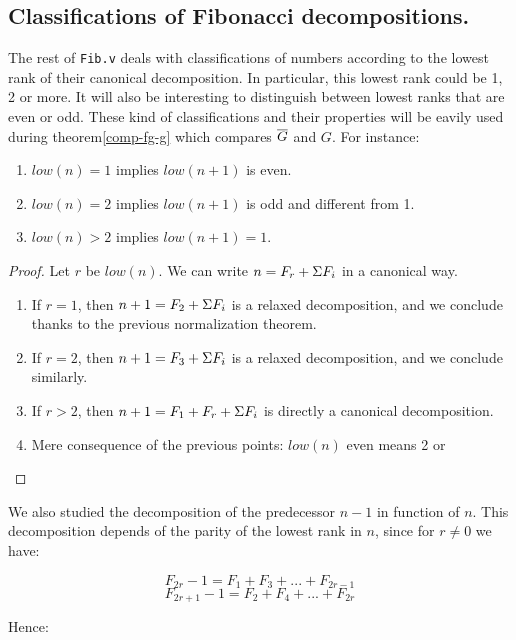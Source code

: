 \documentclass[a4paper,11pt]{article}
\begin{document}
\subsection{Classifications of Fibonacci decompositions.}
The rest of {\tt Fib.v} deals with classifications of numbers
according to the lowest rank of their canonical decomposition.
In particular, this lowest rank could be 1, 2 or more. It will
also be interesting to distinguish between lowest ranks that
are even or odd. These kind of classifications and their
properties will be eavily used
during theorem\ref{comp-fg-g} which compares $\overline{G}$ and $G$.
For instance:
\begin{theorem}\label{fibsucc}
\noindent
\begin{enumerate}
\item $low(n) = 1$ implies $low(n+1)$ is even.
\item $low(n) = 2$ implies $low(n+1)$ is odd and different from 1.
\item $low(n) > 2$ implies $low(n+1) = 1$.
\end{enumerate}
\end{theorem}
\begin{proof}
Let $r$ be $low(n)$. We can write $n = F_r + \Sigma F_i$ in a canonical
way.
\begin{enumerate}
\item If $r = 1$, then $n+1 = F_2 + \Sigma F_i$ is a relaxed decomposition,
  and we conclude thanks to the previous normalization theorem.
\item If $r = 2$, then $n+1 = F_3 + \Sigma F_i$ is a relaxed decomposition,
  and we conclude similarly.
\item If $r > 2$, then $n+1 = F_1 + F_r + \Sigma F_i$ is directly a
  canonical decomposition.
\item Mere consequence of the previous points: $low(n)$ even
means 2 or 

\end{enumerate}
\end{proof}

We also studied the decomposition of the predecessor
$n-1$ in function of $n$. This decomposition depends of the parity of
the lowest rank in $n$, since for $r\neq 0$ we have:

$$ F_{2r} - 1 = F_1 + F_3 + ... + F_{2r-1}$$
$$ F_{2r+1} - 1 = F_2 + F_4 + ... + F_{2r}$$

Hence:
\end{document}
